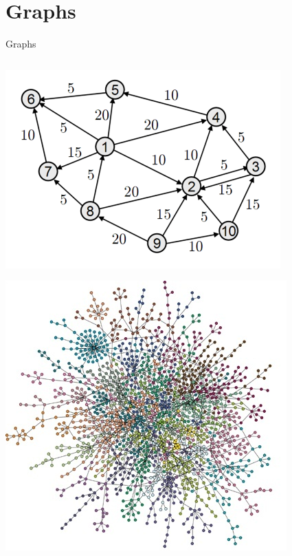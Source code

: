 \part{Graphs}
\frame{\partpage}

\begin{frame}{Graphs}
	\begin{columns}
		\pause
		\begin{column}{0.3\textwidth}
			\includegraphics[width=\textwidth]{graph1}
			\par
			\vspace{2ex}
			\includegraphics[width=\textwidth]{graph2}

\end{column}
\end{columns}
\end{frame}
